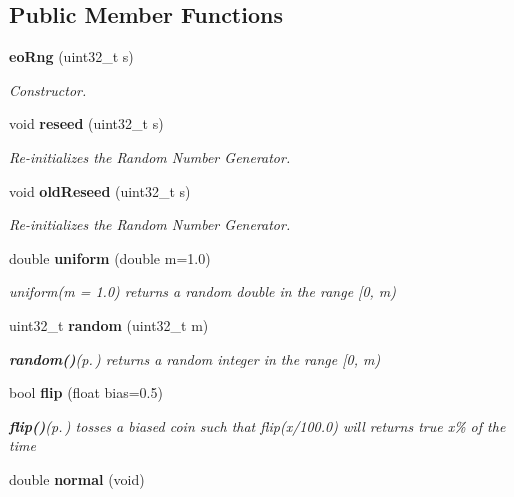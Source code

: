 \subsection*{Public Member Functions}
\begin{CompactItemize}
\item 
{\bf eo\-Rng} (uint32\_\-t s)
\begin{CompactList}\small\item\em Constructor. \item\end{CompactList}\item 
void {\bf reseed} (uint32\_\-t s)
\begin{CompactList}\small\item\em Re-initializes the Random Number Generator. \item\end{CompactList}\item 
void {\bf old\-Reseed} (uint32\_\-t s)
\begin{CompactList}\small\item\em Re-initializes the Random Number Generator. \item\end{CompactList}\item 
double {\bf uniform} (double m=1.0)\label{classeo_rng_a4}

\begin{CompactList}\small\item\em uniform(m = 1.0) returns a random double in the range [0, m) \item\end{CompactList}\item 
uint32\_\-t {\bf random} (uint32\_\-t m)\label{classeo_rng_a5}

\begin{CompactList}\small\item\em {\bf random()}{\rm (p.\,\pageref{classeo_rng_a5})} returns a random integer in the range [0, m) \item\end{CompactList}\item 
bool {\bf flip} (float bias=0.5)\label{classeo_rng_a6}

\begin{CompactList}\small\item\em {\bf flip()}{\rm (p.\,\pageref{classeo_rng_a6})} tosses a biased coin such that flip(x/100.0) will returns true x\% of the time \item\end{CompactList}\item 
double {\bf normal} (void)\label{classeo_rng_a7}


\end{CompactItemize}
